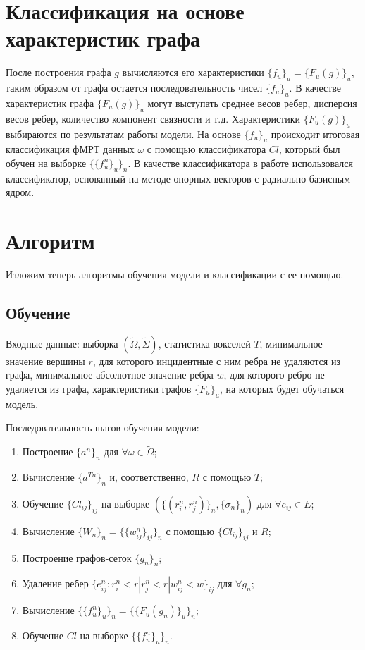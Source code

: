 \documentclass[specialist,
substylefile = spbu_report.rtx,
subf,href,colorlinks=true, 12pt]{disser}
\begin{document}
		\section{Классификация на основе характеристик графа}
			После построения графа $g$ вычисляются его характеристики $\{f_u\}_u = \{F_u(g)\}_u$, таким образом от графа остается последовательность чисел $\{f_u\}_u$. В качестве характеристик графа $\{F_u(g)\}_u$ могут выступать среднее весов ребер, дисперсия весов ребер, количество компонент связности и т.д. Характеристики $\{F_u(g)\}_u$ выбираются по результатам работы модели. На основе $\{f_u\}_u$ происходит итоговая классификация фМРТ данных $\omega$ с помощью классификатора $Cl$, который был обучен на выборке $\{\{f_u^n\}_u\}_n$. В качестве классификатора в работе использовался классификатор, основанный на методе опорных векторов с радиально-базисным ядром.
			
		\section{Алгоритм}
			Изложим теперь алгоритмы обучения модели и классификации с ее помощью. 
						
			\subsection{Обучение}
				Входные данные: выборка $(\widetilde{\Omega}, \widetilde{\Sigma})$, статистика вокселей $T$, минимальное значение вершины $r$, для которого инцидентные с ним ребра не удаляются из графа, минимальное абсолютное значение ребра $w$, для которого ребро не удаляется из графа, характеристики графов $\{F_u\}_u$, на которых будет обучаться модель.			
				
				Последовательность шагов обучения модели:
				\begin{enumerate}
					\item Построение $\{a^n\}_n$ для $\forall \omega \in \widetilde{\Omega}$;
					\item Вычисление $\{a^{Tn}\}_n$ и, соответственно, $R$ с помощью $T$;
					\item Обучение  $\{Cl_{ij}\}_{ij}$ на выборке $(\{(r_i^n, r_j^n)\}_n, \{\sigma_n\}_n)$ для $\forall e_{ij} \in E$;
					\item Вычисление $\{W_n\}_n = \{\{w_{ij}^n\}_{ij}\}_n$ с помощью $\{Cl_{ij}\}_{ij}$ и $R$;
					\item Построение графов-сеток $\{g_n\}_n$;
					\item Удаление ребер $\{e_{ij}^n : r_i^n < r | r_j^n < r | w_{ij}^n < w\}_{ij}$  для $\forall g_n$;
					\item Вычисление $\{\{f^n_u\}_u\}_n = \{\{F_u(g_n)\}_u\}_n$;
					\item Обучение $Cl$ на выборке $\{\{f^n_u\}_u\}_n$.
				\end{enumerate}
			
\end{document}
